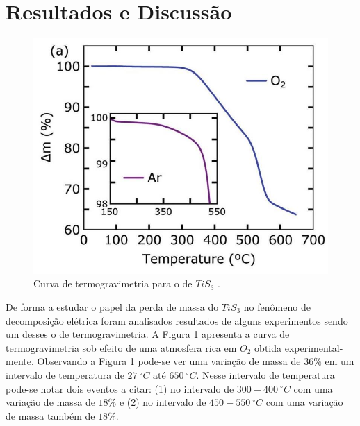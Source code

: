 \documentclass[12pt]{elsarticle}
\begin{document}
\section{Resultados e Discussão} 

\begin{figure}[!htbp]
\centering\includegraphics[scale=0.35]{figures/var-massa-temp.jpg}
\caption{Curva de termogravimetria para o  de $TiS_3$ .}
\label{f1}
\end{figure}
De forma a estudar o papel da perda de massa do $TiS_3$ no fenômeno de decomposição elétrica foram analisados resultados de alguns experimentos sendo um desses o de termogravimetria. A Figura \ref{f1} apresenta a curva de termogravimetria sob efeito de uma atmosfera rica em $O_2$ obtida experimental- \linebreak mente\cite{molina2017high}. Observando a Figura \ref{f1} pode-se ver uma variação de massa de $36\%$ em um intervalo de temperatura de $27~^\circ C$ até $650~^\circ C$. Nesse intervalo de temperatura pode-se notar dois eventos a citar: (1) no intervalo de  $300-400~^\circ C$ com uma variação de massa de $18\%$ e (2) no intervalo de $450-550~^\circ C$ com uma variação de massa também de $18\%$. 
\end{document}
